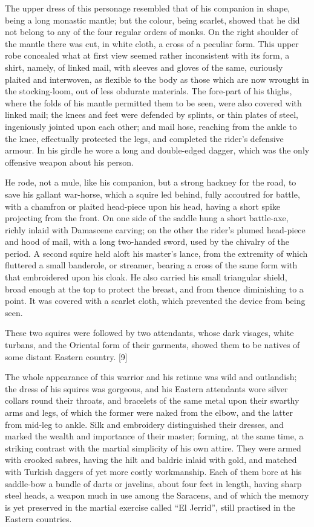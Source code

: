 The upper dress of this personage resembled that of his companion in
shape, being a long monastic mantle; but the colour, being scarlet,
showed that he did not belong to any of the four regular orders of
monks. On the right shoulder of the mantle there was cut, in white
cloth, a cross of a peculiar form. This upper robe concealed what at
first view seemed rather inconsistent with its form, a shirt, namely, of
linked mail, with sleeves and gloves of the same, curiously plaited and
interwoven, as flexible to the body as those which are now wrought in
the stocking-loom, out of less obdurate materials. The fore-part of his
thighs, where the folds of his mantle permitted them to be seen, were
also covered with linked mail; the knees and feet were defended by
splints, or thin plates of steel, ingeniously jointed upon each other;
and mail hose, reaching from the ankle to the knee, effectually
protected the legs, and completed the rider's defensive armour. In his
girdle he wore a long and double-edged dagger, which was the only
offensive weapon about his person.

He rode, not a mule, like his companion, but a strong hackney for the
road, to save his gallant war-horse, which a squire led behind, fully
accoutred for battle, with a chamfron or plaited head-piece upon his
head, having a short spike projecting from the front. On one side of the
saddle hung a short battle-axe, richly inlaid with Damascene carving; on
the other the rider's plumed head-piece and hood of mail, with a long
two-handed sword, used by the chivalry of the period. A second squire
held aloft his master's lance, from the extremity of which fluttered a
small banderole, or streamer, bearing a cross of the same form with that
embroidered upon his cloak. He also carried his small triangular shield,
broad enough at the top to protect the breast, and from thence
diminishing to a point. It was covered with a scarlet cloth, which
prevented the device from being seen.

These two squires were followed by two attendants, whose dark visages,
white turbans, and the Oriental form of their garments, showed them to
be natives of some distant Eastern country. {[}9{]}

The whole appearance of this warrior and his retinue was wild and
outlandish; the dress of his squires was gorgeous, and his Eastern
attendants wore silver collars round their throats, and bracelets of the
same metal upon their swarthy arms and legs, of which the former were
naked from the elbow, and the latter from mid-leg to ankle. Silk and
embroidery distinguished their dresses, and marked the wealth and
importance of their master; forming, at the same time, a striking
contrast with the martial simplicity of his own attire. They were armed
with crooked sabres, having the hilt and baldric inlaid with gold, and
matched with Turkish daggers of yet more costly workmanship. Each of
them bore at his saddle-bow a bundle of darts or javelins, about four
feet in length, having sharp steel heads, a weapon much in use among the
Saracens, and of which the memory is yet preserved in the martial
exercise called ``El Jerrid'', still practised in the Eastern countries.

